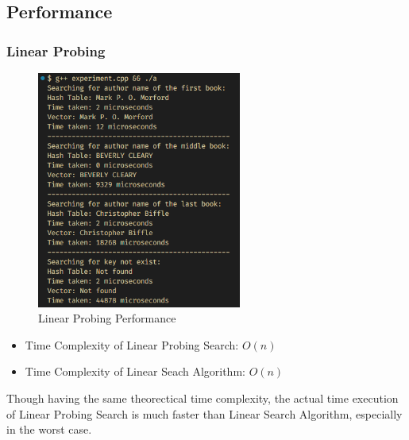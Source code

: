 \subsection{Performance}
\subsubsection*{Linear Probing}
\begin{figure}[H]
	\centering
	\includegraphics[width=0.6\textwidth]{images/linear_prob/experiment.png}
	\caption{Linear Probing Performance}
\end{figure}
\begin{itemize}
	\item Time Complexity of Linear Probing Search: \(O(n)\)
	\item Time Complexity of Linear Seach Algorithm: \(O(n)\)
\end{itemize}
Though having the same theorectical time complexity, the actual time execution of Linear Probing Search is much faster than Linear Search Algorithm, especially in the worst case.

